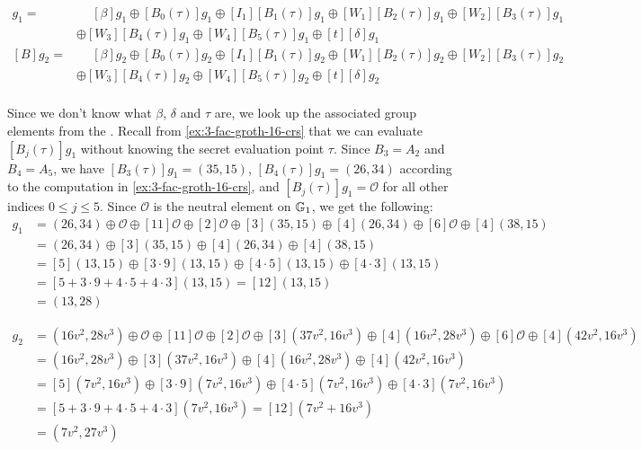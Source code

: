 \begin{example}
\begin{align*}
[B]g_1 = &\phantom{\oplus} [\beta]g_1 \oplus [B_0(\tau)]g_1 \oplus [I_1][B_1(\tau)]g_1\oplus [W_1][B_2(\tau)]g_1 \oplus [W_2][B_3(\tau)]g_1\\ 
       & \oplus [W_3][B_4(\tau)]g_1\oplus [W_4][B_5(\tau)]g_1\oplus [t][\delta]g_1\\
[B]g_2 = &\phantom{\oplus} [\beta]g_2 \oplus [B_0(\tau)]g_2 \oplus [I_1][B_1(\tau)]g_2\oplus [W_1][B_2(\tau)]g_2 \oplus [W_2][B_3(\tau)]g_2\\ 
       & \oplus [W_3][B_4(\tau)]g_2\oplus [W_4][B_5(\tau)]g_2\oplus [t][\delta]g_2\\       
\end{align*}

Since we don't know what $\beta$, $\delta$ and $\tau$ are, we look up the associated group elements from the . Recall from \ref{ex:3-fac-groth-16-crs} that we can evaluate $[B_j(\tau)]g_1$ without knowing the secret evaluation point $\tau$. Since $B_3=A_2$ and $B_4=A_5$, we have $[B_3(\tau)]g_1=(35,15)$, $[B_4(\tau)]g_1=(26,34)$ according to the computation in \ref{ex:3-fac-groth-16-crs}, and $[B_j(\tau)]g_1=\mathcal{O}$ for all other indices $0\leq j\leq 5$. Since $\mathcal{O}$ is the neutral element on $\mathbb{G}_1$, we get the following:
\begin{align*}
[B]g_1 &= (26,34) \oplus \mathcal{O}\oplus [11]\mathcal{O}\oplus [2]\mathcal{O} \oplus [3](35,15) \oplus [4](26,34)\oplus [6]\mathcal{O}\oplus [4](38,15)\\    
       &= (26,34)\oplus [3](35,15) \oplus [4](26,34)\oplus [4](38,15)\\  
       &= [5](13,15)\oplus [3\cdot 9](13,15) \oplus [4\cdot 5](13,15)\oplus [4\cdot 3](13,15)\\        
       &= [5+3\cdot 9+4\cdot 5+4\cdot 3](13,15) = [12](13,15) \\
       &= (13,28)
\end{align*}

\begin{align*}
[B]g_2 &=(16v^2,28v^3) \oplus \mathcal{O} \oplus [11]\mathcal{O}\oplus [2]\mathcal{O} \oplus [3](37v^2,16v^3)\oplus [4](16v^2,28v^3)\oplus [6]\mathcal{O}\oplus [4](42v^2,16v^3)\\    
         &=(16v^2,28v^3)\oplus [3](37v^2,16v^3)\oplus [4](16v^2,28v^3)\oplus [4](42v^2,16v^3)\\
         &=[5](7v^2,16v^3)\oplus [3\cdot 9](7v^2,16v^3)\oplus [4\cdot 5](7v^2,16v^3)\oplus [4\cdot 3](7v^2,16v^3)\\          
         &=[5+3\cdot 9+4\cdot 5+4\cdot 3](7v^2,16v^3)=[12](7v^2+16v^3)\\
         &= (7v^2,27v^3)     
\end{align*}


\end{example}
